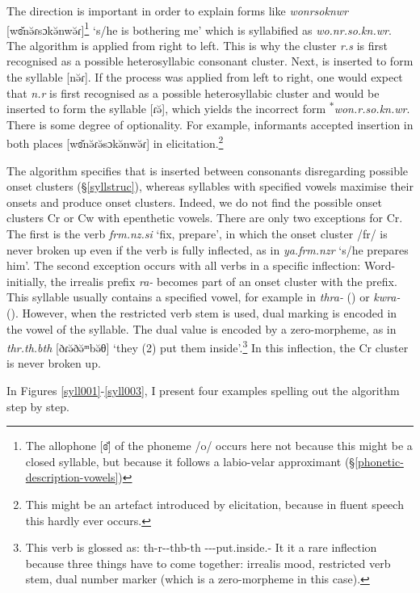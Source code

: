 The direction is important in order to explain forms like \emph{wonrsoknwr} [wɞ̆nə̆ɾsɔkə̆nwə̆ɾ]\footnote{The allophone [ɞ̆] of the phoneme /o/ occurs here not because this might be a closed syllable, but because it follows a labio-velar approximant ({\S}\ref{phonetic-description-vowels})} `s/he is bothering me' which is syllabified as \emph{wo.nr.so.kn.wr}. The algorithm is applied from right to left. This is why the cluster \emph{r.s} is first recognised as a possible heterosyllabic consonant cluster. Next,  is inserted to form the syllable [nə̆ɾ]. If the process was applied from left to right, one would expect that \emph{n.r} is first recognised as a possible heterosyllabic cluster and  would be inserted to form the syllable [ɾə̆], which yields the incorrect form \textsuperscript{$\ast$}\emph{won.r.so.kn.wr}. There is some degree of optionality. For example, informants accepted  insertion in both places [wɞ̆nə̆ɾə̆sɔkə̆nwə̆ɾ] in elicitation.\footnote{This might be an artefact introduced by elicitation, because in fluent speech this hardly ever occurs.}

The algorithm specifies that  is inserted between consonants disregarding possible onset clusters ({\S}\ref{syllstruc}), whereas syllables with specified vowels maximise their onsets and produce onset clusters. Indeed, we do not find the possible onset clusters Cr or Cw with epenthetic vowels. There are only two exceptions for Cr. The first is the verb \emph{frm.nz.si} `fix, prepare', in which the onset cluster /fr/ is never broken up even if the verb is fully inflected, as in \emph{ya.frm.nzr} `s/he prepares him'. The second exception occurs with all verbs in a specific inflection: Word-initially, the irrealis prefix \emph{ra-} becomes part of an onset cluster with the  prefix. This syllable usually contains a specified vowel, for example in \emph{thra-} ({\Stnsg}) or \emph{kwra-} ({\Fsg}). However, when the restricted verb stem is used, dual marking is encoded in the vowel of the syllable. The dual value is encoded by a zero-morpheme, as in \emph{thr.th.bth} [ðɾə̆ðə̆ᵐbə̆θ] `they (2) put them inside'.\footnote{This verb is glossed as: th-r-\Zero{}-thb-th \Stnsg-\Irr-\Ndu-put.inside.{\Rs}-\Stnsg{} It it a rare inflection because three things have to come together: irrealis mood, restricted verb stem, dual number marker (which is a zero-morpheme in this case).} In this inflection, the Cr cluster is never broken up.

In Figures \ref{syll001}-\ref{syll003}, I present four examples spelling out the algorithm step by step.

